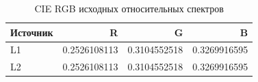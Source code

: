 \begin{table}[H]\centering\small
\caption{CIE RGB исходных относительных спектров}
\begin{tabular}{@{}lrrr@{}}\toprule Источник & R & G & B\\\midrule
L1 & 0.2526108113 & 0.3104552518 & 0.3269916595 \\
L2 & 0.2526108113 & 0.3104552518 & 0.3269916595 \\
\bottomrule\end{tabular}\end{table}